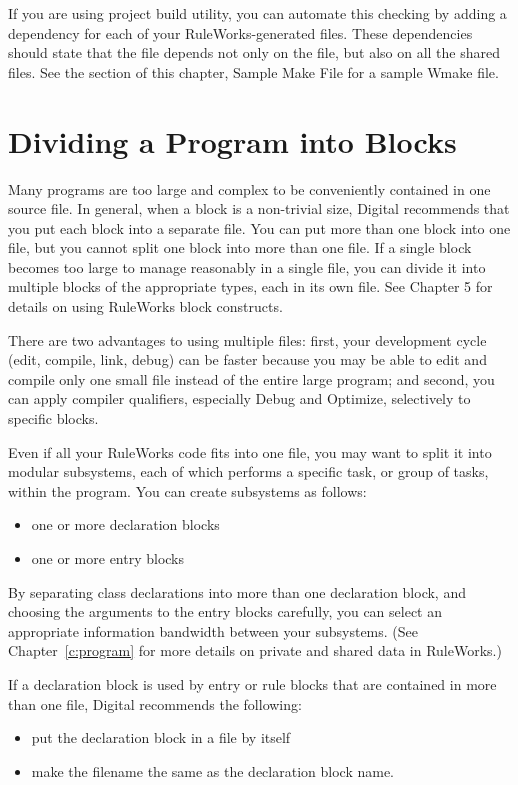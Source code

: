 If you are using project build utility, you can automate this checking
by adding a dependency for each of your RuleWorks-generated 
files. These dependencies should state that the  file depends
not only on the  file, but also on all the shared 
files. See the section of this chapter, Sample Make File for a sample
Wmake file.

\section{Dividing a Program into Blocks}

Many programs are too large and complex to be conveniently contained
in one source file. In general, when a block is a non-trivial size,
Digital recommends that you put each block into a separate file. You
can put more than one block into one file, but you cannot split one
block into more than one file. If a single block becomes too large to
manage reasonably in a single file, you can divide it into multiple
blocks of the appropriate types, each in its own file. See Chapter 5
for details on using RuleWorks block constructs.

There are two advantages to using multiple files: first, your
development cycle (edit, compile, link, debug) can be faster because
you may be able to edit and compile only one small file instead of the
entire large program; and second, you can apply compiler qualifiers,
especially Debug and Optimize, selectively to specific blocks.

Even if all your RuleWorks code fits into one file, you may want to
split it into modular subsystems, each of which performs a specific
task, or group of tasks, within the program. You can create subsystems
as follows:

\begin{itemize}
\item one or more declaration blocks
\item one or more entry blocks
\end{itemize}

By separating class declarations into more than one declaration block,
and choosing the arguments to the entry blocks carefully, you can
select an appropriate information bandwidth between your
subsystems. (See Chapter~\ref{c:program} for more details on private
and shared data in RuleWorks.)

\begin{note}
  If a declaration block is used by entry or rule blocks that are
  contained in more than one file, Digital recommends the following:
  \begin{itemize}
  \item put the declaration block in a file by itself
  \item make the filename the same as the declaration block name.
  \end{itemize}
\end{note}

